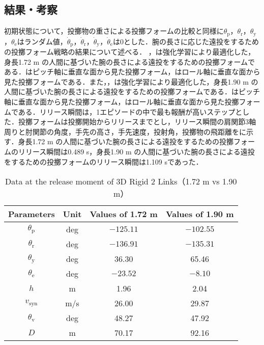\subsection{結果・考察}
初期状態について，投擲物の重さによる投擲フォームの比較と同様に$\theta_{\mathrm{p}}$，$\theta_{\mathrm{r}}$，$\theta_{\mathrm{y}}$，$\theta_{\mathrm{e}}$はランダム値，$\dot{\theta}_{\mathrm{p}}$，$\dot{\theta}_{\mathrm{r}}$，$\dot{\theta}_{\mathrm{y}}$，$\dot{\theta}_{\mathrm{e}}$は0とした．腕の長さに応じた遠投をするための投擲フォーム戦略の結果について述べる．
，は強化学習により最適化した，身長1.72 m の人間に基づいた腕の長さによる遠投をするための投擲フォームである．はピッチ軸に垂直な面から見た投擲フォーム，はロール軸に垂直な面から見た投擲フォームである．また，，は強化学習により最適化した，身長1.90 m の人間に基づいた腕の長さによる遠投をするための投擲フォームである．はピッチ軸に垂直な面から見た投擲フォーム，はロール軸に垂直な面から見た投擲フォームである．リリース瞬間は，1エピソードの中で最も報酬が高いステップとした．投擲フォームは投擲開始からリリースまでとし，リリース瞬間の肩関節3軸周りと肘関節の角度，手先の高さ，手先速度，投射角，投擲物の飛距離をに示す．身長1.72 m の人間に基づいた腕の長さによる遠投をするための投擲フォームのリリース瞬間は0.489 s，身長1.90 m の人間に基づいた腕の長さによる遠投をするための投擲フォームのリリース瞬間は1.109 sであった．

\begin{table}[tb]
  \begin{center}
    \caption{Data at the release moment of 3D Rigid 2 Links（1.72 m vs 1.90 m）}
    \begin{tabular}{c|c|c|c}
      \hline
      Parameters & Unit & Values of 1.72 m & Values of 1.90 m \\
      \hline
      $\theta_{\mathrm{p}}$ & deg & $-125.11$ & $-102.55$ \\
      $\theta_{\mathrm{r}}$ & deg & $-136.91$ & $-135.31$ \\
      $\theta_{\mathrm{y}}$ & deg  & 36.30 & 65.46 \\
      $\theta_{\mathrm{e}}$ & deg & $-23.52$ & $-8.10$ \\
      $h$ & m & 1.96 & 2.04 \\
      $v_{\mathrm{syn}}$ & m/s & 26.00 & 29.87 \\
      $\theta_{\mathrm{v}}$ & deg & 48.27 & 47.92 \\
      $D$ & m & 70.17 & 92.16 \\
      \hline
    \end{tabular}
  \end{center}
\end{table}

